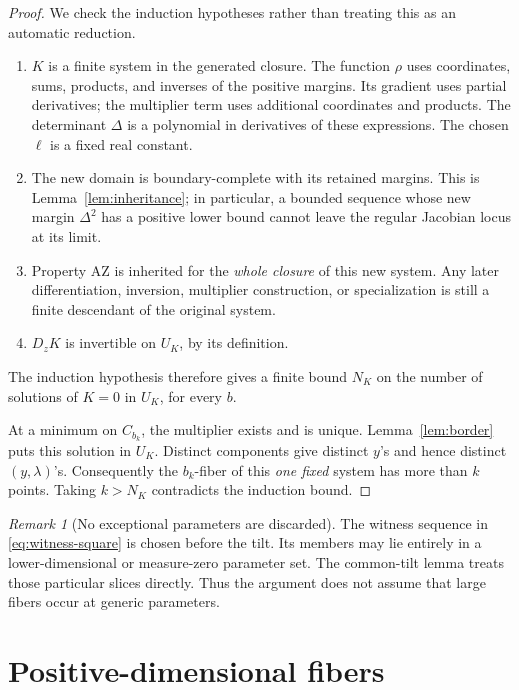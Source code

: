 \documentclass[11pt]{article}
\theoremstyle{definition}
\theoremstyle{remark}
\newtheorem{remark}[theorem]{Remark}
\newcommand{\AZ}{\mathrm{AZ}}
\begin{document}
\begin{proof}
We check the induction hypotheses rather than treating this as an
automatic reduction.
\begin{enumerate}[label=(\roman*),leftmargin=*]
\item \(K\) is a finite system in the generated closure.
The function \(\rho\) uses coordinates, sums, products, and inverses
of the positive margins. Its gradient uses partial derivatives;
the multiplier term uses additional coordinates and products.
The determinant \(\Delta\) is a polynomial in derivatives of these
expressions. The chosen \(\ell\) is a fixed real constant.
\item The new domain is boundary-complete with its retained margins.
This is Lemma~\ref{lem:inheritance}; in particular, a bounded sequence
whose new margin \(\Delta^2\) has a positive lower bound cannot leave
the regular Jacobian locus at its limit.
\item Property \(\AZ\) is inherited for the \emph{whole closure} of
this new system. Any later differentiation, inversion, multiplier
construction, or specialization is still a finite descendant of
the original system.
\item \(D_zK\) is invertible on \(U_K\), by its definition.
\end{enumerate}
The induction hypothesis therefore gives a finite bound \(N_K\)
on the number of solutions of \(K=0\) in \(U_K\), for every \(b\).

At a minimum on \(C_{b_k}\), the multiplier exists and is unique.
Lemma~\ref{lem:border} puts this solution in \(U_K\). Distinct
components give distinct \(y\)'s and hence distinct \((y,\lambda)\)'s.
Consequently the \(b_k\)-fiber of this \emph{one fixed} system has
more than \(k\) points. Taking \(k>N_K\) contradicts the induction
bound.
\end{proof}

\begin{remark}[No exceptional parameters are discarded]
\label{rem:exceptional}
The witness sequence in \eqref{eq:witness-square} is chosen before
the tilt. Its members may lie entirely in a lower-dimensional or
measure-zero parameter set. The common-tilt lemma treats those
particular slices directly. Thus the argument does not assume that
large fibers occur at generic parameters.
\end{remark}

\section{Positive-dimensional fibers}
\label{sec:components}
\end{document}
